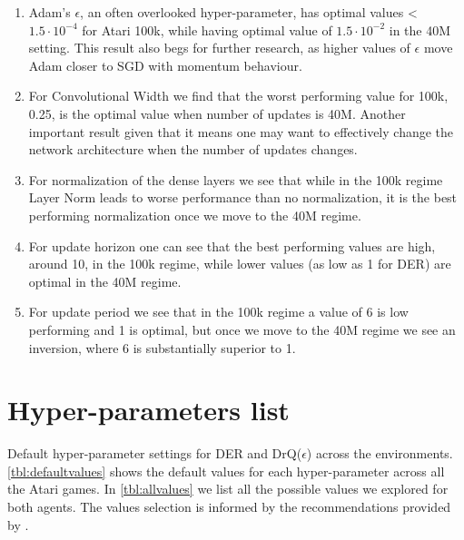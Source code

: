 \begin{enumerate}
    \item Adam's $\epsilon$, an often overlooked hyper-parameter, has optimal values < $1.5 \cdot 10^{-4}$ for Atari 100k, while having optimal value of $1.5 \cdot 10^{-2}$ in the 40M setting. This result also begs for further research, as higher values of $\epsilon$ move Adam closer to SGD with momentum behaviour.
    \item For Convolutional Width we find that the worst performing value for 100k, 0.25, is the optimal value when number of updates is 40M. Another important result given that it means one may want to effectively change the network architecture when the number of updates changes.
    \item For normalization of the dense layers we see that while in the 100k regime Layer Norm leads to worse performance than no normalization, it is the best performing normalization once we move to the 40M regime.
    \item For update horizon one can see that the best performing values are high, around 10, in the 100k regime, while lower values (as low as 1 for DER) are optimal in the 40M regime.
    \item For update period we see that in the 100k regime a value of 6 is low performing and 1 is optimal, but once we move to the 40M regime we see an inversion, where 6 is substantially superior to 1.
\end{enumerate}

\clearpage

\section{Hyper-parameters list}
\label{sec:list_hyperparameters}

Default hyper-parameter settings for DER and DrQ($\epsilon$) across the environments. \autoref{tbl:defaultvalues} shows the default values for each hyper-parameter across all the Atari games. In \autoref{tbl:allvalues} we list all the possible values we explored for both agents. The values selection is informed by the recommendations provided by \citet{joajo2021lifting}.


